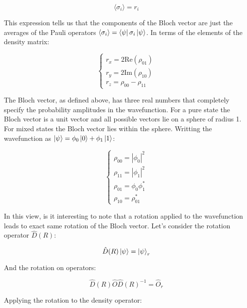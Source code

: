 \begin{equation}
    \langle \sigma_{i} \rangle = r_{i}
\end{equation}

This expression tells us that the components of the Bloch vector are just the averages of the Pauli operators
$\langle \sigma_{i} \rangle = \bra{\psi} \sigma_{i} \ket{\psi}$. In terms of the elements of the density matrix:

\begin{equation}
\begin{cases}
    r_{x} = 2 \mathrm{Re}(\rho_{01})\\
    r_{y} = 2 \mathrm{Im}(\rho_{10}) \\
    r_{z} = \rho_{00} - \rho_{11}
\end{cases}
\end{equation}

The Bloch vector, as defined above, has three real numbers that completely specify the probability amplitudes in the wavefunction. For a pure state the Bloch vector is a unit vector and all possible vectors lie on a sphere of radius 1. For mixed states the Bloch vector lies within the sphere.
Writting the wavefunction as $\ket{\psi} = \phi_{0} \ket{0} + \phi_{1} \ket{1}$:

\begin{equation}
\begin{cases}
    \rho_{00} = |\phi_{0}|^{2} \\
    \rho_{11} = |\phi_{1}|^{2} \\
    \rho_{01} = \phi_{0}\phi_{1}^{*} \\
    \rho_{10} = \rho_{01}^{*}
\end{cases}
\end{equation}

In this view, is it interesting to note that a rotation applied to the wavefunction leads to exact same rotation of the Bloch vector. Let's consider the rotation operator $\hat{D}(R)$:

\begin{equation}
    \hat{D}(R) \ket{\psi} = \ket{\psi}_{r}
\end{equation}

And the rotation on operators:

\begin{equation}
    \hat{D}(R) \hat{O} \hat{D}(R)^{-1} = \hat{O}_{r}
\end{equation}

Applying the rotation to the density operator:

